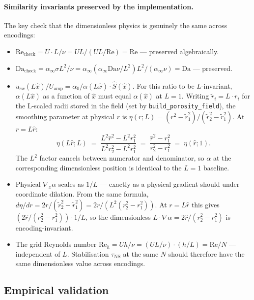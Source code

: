 \documentclass[11pt]{article}
\newcommand{\code}[1]{\texttt{#1}}
\begin{document}
\paragraph{Similarity invariants preserved by the implementation.} The
key check that the dimensionless physics is genuinely the same across
encodings:
\begin{itemize}
\item $\mathrm{Re}_{\mathrm{check}} = U \cdot L / \nu = U L / (UL/\mathrm{Re}) = \mathrm{Re}$
      — preserved algebraically.
\item $\mathrm{Da}_{\mathrm{check}} = \alpha_\infty \sigma L^2 / \nu
      = \alpha_\infty (\alpha_\infty \mathrm{Da} \nu / L^2) L^2 / (\alpha_\infty \nu) = \mathrm{Da}$
      — preserved.
\item $u_{ex}(L\hat{x}) / U_{\mathrm{amp}} = \alpha_0 / \alpha(L\hat{x}) \cdot \hat{S}(\hat{x})$.
      For this ratio to be $L$-invariant, $\alpha(L\hat{x})$ as a
      function of $\hat{x}$ must equal $\alpha(\hat{x})$ at $L=1$.
      Writing $\tilde{r}_i = L \cdot r_i$ for the L-scaled radii stored
      in the field (set by \code{build\_porosity\_field}), the
      smoothing parameter at physical $r$ is
      $\eta(r; L) = (r^2 - \tilde{r}_1^2)/(\tilde{r}_2^2 - \tilde{r}_1^2)$.
      At $r = L\hat{r}$:
      \[
        \eta(L\hat{r}; L) \;=\; \frac{L^2 \hat{r}^2 - L^2 r_1^2}{L^2 r_2^2 - L^2 r_1^2}
        \;=\; \frac{\hat{r}^2 - r_1^2}{r_2^2 - r_1^2}
        \;=\; \eta(\hat{r}; 1).
      \]
      The $L^2$ factor cancels between numerator and denominator, so
      $\alpha$ at the corresponding dimensionless position is identical
      to the $L=1$ baseline.
\item Physical $\nabla_x \alpha$ scales as $1/L$ — exactly as a physical
      gradient should under coordinate dilation. From the same formula,
      $d\eta/dr = 2r/(\tilde{r}_2^2 - \tilde{r}_1^2) = 2r/(L^2 (r_2^2 - r_1^2))$.
      At $r = L \hat{r}$ this gives $(2\hat{r}/(r_2^2 - r_1^2)) \cdot 1/L$,
      so the dimensionless $L \cdot \nabla \alpha = 2 \hat{r}/(r_2^2 - r_1^2)$
      is encoding-invariant.
\item The grid Reynolds number $\mathrm{Re}_h = U h / \nu
      = (U L / \nu) \cdot (h/L) = \mathrm{Re} / N$ — independent of $L$.
      Stabilisation $\tau_{\mathrm{NS}}$ at the same $N$ should therefore have
      the same dimensionless value across encodings.
\end{itemize}

\subsection{Empirical validation}
\label{sec:varL-empirical}
\end{document}
